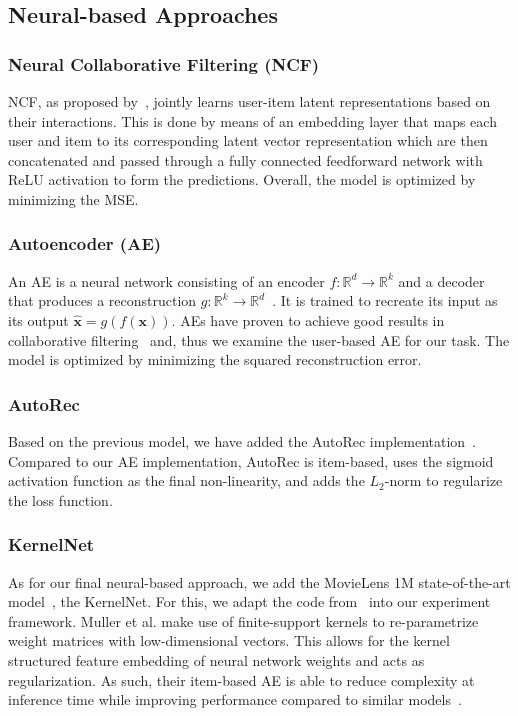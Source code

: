 \documentclass[10pt,conference,compsocconf]{IEEEtran}
\begin{document}
    \subsection{Neural-based Approaches}

    \subsubsection{Neural Collaborative Filtering \textbf{(NCF)}}
    NCF, as proposed by~\cite{DBLP:journals/corr/abs-1708-05031}, jointly learns user-item latent representations based on their interactions.
    This is done by means of an embedding layer that maps each user and item to its corresponding latent vector representation which are then concatenated and passed through a fully connected feedforward network with ReLU activation to form the predictions.
    Overall, the model is optimized by minimizing the MSE.

    \subsubsection{Autoencoder \textbf{(AE)}}
    An AE is a neural network consisting of an encoder $f: \mathbb{R} ^d \rightarrow \mathbb{R} ^k$ and a
    decoder that produces a reconstruction $g: \mathbb{R} ^k \rightarrow \mathbb{R} ^d$~\cite{Goodfellow-et-al-2016}.
    It is trained to recreate its input as its output $\mathbf{ \hat{x} } = g(f(\mathbf{x}))$.
    AEs have proven to achieve good results in collaborative filtering~\cite{inproceedings} and, thus we examine the user-based AE for our task.
    The model is optimized by minimizing the squared reconstruction error.

    \subsubsection{AutoRec}
    Based on the previous model, we have added the AutoRec implementation~\cite{inproceedings}.
    Compared to our AE implementation, AutoRec is item-based, uses the sigmoid activation function as the final non-linearity, and adds the $L_2$-norm to regularize the loss function.

    \subsubsection{KernelNet}
    As for our final neural-based approach, we add the MovieLens 1M state-of-the-art model~\cite{noauthor_papers_nodate}, the KernelNet.
    For this, we adapt the code from~\cite{pmlr-v80-muller18a, kernelNetGithub} into our experiment framework.
    Muller et al. make use of finite-support kernels to re-parametrize weight matrices with low-dimensional vectors.
    This allows for the kernel structured feature embedding of neural network weights and acts as regularization.
    As such, their item-based AE is able to reduce complexity at inference time while improving performance compared to similar models~\cite{pmlr-v80-muller18a}.
\end{document}
